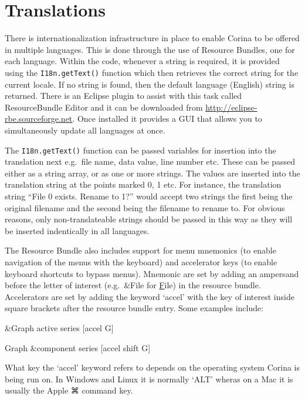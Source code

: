 \section{Translations}
There is internationalization infrastructure in place to enable Corina to be offered in multiple languages.  This is done through the use of Resource Bundles, one for each language.  Within the code, whenever a string is required, it is provided using the \verb|I18n.getText()| function which then retrieves the correct string for the current locale.  If no string is found, then the default language (English) string is returned.  There is an Eclipse plugin to assist with this task called ResourceBundle Editor and it can be downloaded from \url{http://eclipse-rbe.sourceforge.net}.  Once installed it provides a GUI that allows you to simultaneously update all languages at once.

The \verb|I18n.getText()| function can be passed variables for insertion into the translation next e.g.\ file name, data value, line number etc.  These can be passed either as a string array, or as one or more strings.  The values are inserted into the translation string at the points marked {0}, {1} etc.  For instance, the translation string ``File {0} exists.  Rename to {1}?'' would accept two strings the first being the original filename and the second being the filename to rename to.  For obvious reasons, only non-translateable strings should be passed in this way as they will be inserted indentically in all languages.

The Resource Bundle also includes support for menu mnemonics (to enable navigation of the menus with the keyboard) and accelerator keys (to enable keyboard shortcuts to bypass menus).  Mnemonic are set by adding an ampersand before the letter of interest (e.g.\ {\&}File for \underline{F}ile) in the resource bundle.  Accelerators are set by adding the keyword `accel' with the key of interest inside square brackets after the resource bundle entry.  Some examples include:

\begin{itemize*}
 \item {\&}Graph active series [accel G]
 \item Graph {\&}component series [accel shift G]
\end{itemize*}

What key the `accel' keyword refers to depends on the operating system Corina is being run on.  In Windows and Linux it is normally `ALT' wheras on a Mac it is usually the Apple ⌘ command key. 


